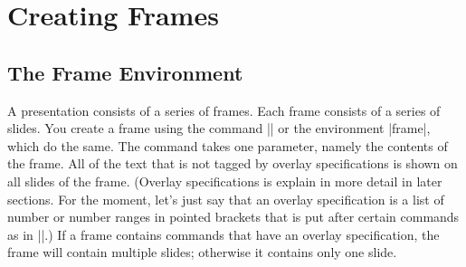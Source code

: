 %

\section{Creating Frames}

\label{section-frames}

\subsection{The Frame Environment}

A presentation consists of a series of frames. Each frame consists of
a series of slides. You create a frame using the command
|\frame| or the environment |frame|, which do the same. The command
takes one parameter, namely the contents of the frame. All of the
text that is not tagged by overlay specifications is shown on all
slides of the frame. (Overlay specifications is explain
in more detail in later sections. For the moment, let's just say
that an overlay specification is a list of number or number ranges in
pointed brackets that is put after certain commands as in
||.) If a frame contains commands that have an
overlay specification, the frame will contain multiple slides;
otherwise it contains only one slide.

